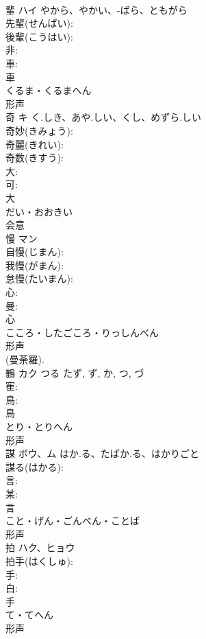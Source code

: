\documentclass[8pt]{extreport}
\begin{document}
\begin{CJK}{UTF8}{min}
\\	輩	ハイ	やから、やかい、-ばら、ともがら		
\\	先輩(せんぱい): 
\\	後輩(こうはい): 
\\	非: 
\\	車: 
\\	車	
\\	くるま・くるまへん	
\\	形声 
\\	奇	キ	く.しき、あや.しい、くし、めずら.しい		
\\	奇妙(きみょう): 
\\	奇麗(きれい): 
\\	奇数(きすう): 
\\	大: 
\\	可: 
\\	大	
\\	だい・おおきい	
\\	会意 
\\	慢	マン			
\\	自慢(じまん): 
\\	我慢(がまん): 
\\	怠慢(たいまん): 
\\	心: 
\\	曼: 
\\	心	
\\	こころ・したごころ・りっしんべん	
\\	形声 
\\	(曼荼羅). 
\\	鶴	カク	つる	たず, ず, か, つ, づ	
\\	寉: 
\\	鳥: 
\\	鳥	
\\	とり・とりへん	
\\	形声 
\\	謀	ボウ、ム	はか.る、たばか.る、はかりごと		
\\	謀る(はかる): 
\\	言: 
\\	某: 
\\	言	
\\	こと・げん・ごんべん・ことば	
\\	形声 
\\	拍	ハク、ヒョウ			
\\	拍手(はくしゅ): 
\\	手: 
\\	白: 
\\	手	
\\	て・てへん	
\\	形声 

\end{CJK}
\end{document}
